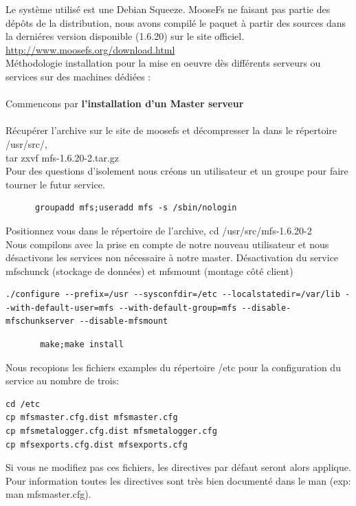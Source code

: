 \documentclass[12pt]{report}
\begin{document}
Le système utilisé est une Debian Squeeze. MooseFs ne faisant pas partie des dépôts de la distribution, nous avons compilé le paquet à partir des sources dans la derniéres version disponible (1.6.20) sur le site officiel.\\
\href{http://pro.hit.gemius.pl/hitredir/id=0sWa0S8ft4sTAHF1bGAAEZPcP3ziyq7f9SdhoQf7oeT.c7/url=moosefs.org/tl\_files/mfscode/mfs-1.6.20-2.tar.gz}{http://www.moosefs.org/download.html} \\
Méthodologie installation pour la mise en oeuvre dès différents serveurs ou services sur des machines dédiées :\\\\
Commencons par \textbf{l'installation d'un Master serveur}\\\\
Récupérer l'archive sur le site de moosefs et décompresser la dans le répertoire /usr/src/,\\ tar zxvf mfs-1.6.20-2.tar.gz\\
Pour des questions d'isolement nous créons un utilisateur et un groupe pour faire tourner le futur service.\\
\begin{lstlisting}
	  groupadd mfs;useradd mfs -s /sbin/nologin
	  \end{lstlisting}
Positionnez vous dans le répertoire de l'archive, cd /usr/src/mfs-1.6.20-2\\
Nous compilons avec la prise en compte de notre nouveau utilisateur et nous désactivons les services non nécessaire à notre master.
Désactivation du service mfschunck (stockage de données) et mfsmount (montage côté client)
\begin{lstlisting}
./configure --prefix=/usr --sysconfdir=/etc --localstatedir=/var/lib --with-default-user=mfs --with-default-group=mfs --disable-mfschunkserver --disable-mfsmount
	  \end{lstlisting}
\begin{lstlisting}
	   make;make install
	  \end{lstlisting}
Nous recopions les fichiers examples du répertoire /etc pour la configuration du service au nombre de trois:
\begin{lstlisting}
cd /etc
cp mfsmaster.cfg.dist mfsmaster.cfg
cp mfsmetalogger.cfg.dist mfsmetalogger.cfg
cp mfsexports.cfg.dist mfsexports.cfg
	  \end{lstlisting}
Si vous ne modifiez pas ces fichiers, les directives par défaut seront alors applique.
Pour information toutes les directives sont très bien documenté dans le man (exp: man mfsmaster.cfg).\\
\end{document}
